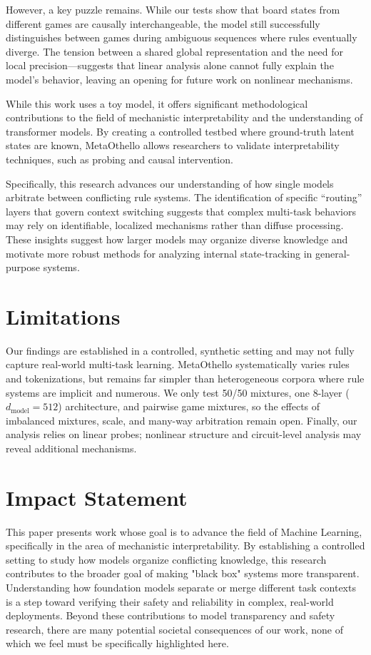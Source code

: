 \documentclass{article}
\theoremstyle{plain}
\theoremstyle{definition}
\theoremstyle{remark}
\begin{document}
However, a key puzzle remains. While our tests show that board states from different games are causally interchangeable, the model still successfully distinguishes between games during ambiguous sequences where rules eventually diverge. The tension between a shared global representation and the need for local precision—suggests that linear analysis alone cannot fully explain the model's behavior, leaving an opening for future work on nonlinear mechanisms.

While this work uses a toy model, it offers significant methodological contributions to the field of mechanistic interpretability and the understanding of transformer models. By creating a controlled testbed where ground-truth latent states are known, MetaOthello allows researchers to validate interpretability techniques, such as probing and causal intervention.

Specifically, this research advances our understanding of how single models arbitrate between conflicting rule systems. The identification of specific ``routing'' layers that govern context switching suggests that complex multi-task behaviors may rely on identifiable, localized mechanisms rather than diffuse processing. These insights suggest how larger models may organize diverse knowledge and motivate more robust methods for analyzing internal state-tracking in general-purpose systems.

\section{Limitations}
Our findings are established in a controlled, synthetic setting and may not fully capture real-world multi-task learning. MetaOthello systematically varies rules and tokenizations, but remains far simpler than heterogeneous corpora where rule systems are implicit and numerous. We only test 50/50 mixtures, one 8-layer ($d_{\text{model}}=512$) architecture, and pairwise game mixtures, so the effects of imbalanced mixtures, scale, and many-way arbitration remain open. Finally, our analysis relies on linear probes; nonlinear structure and circuit-level analysis may reveal additional mechanisms.

\section*{Impact Statement}

This paper presents work whose goal is to advance the field of Machine Learning, specifically in the area of mechanistic interpretability. By establishing a controlled setting to study how models organize conflicting knowledge, this research contributes to the broader goal of making "black box" systems more transparent. Understanding how foundation models separate or merge different task contexts is a step toward verifying their safety and reliability in complex, real-world deployments. Beyond these contributions to model transparency and safety research, there are many potential societal consequences of our work, none of which we feel must be specifically highlighted here.
\end{document}
